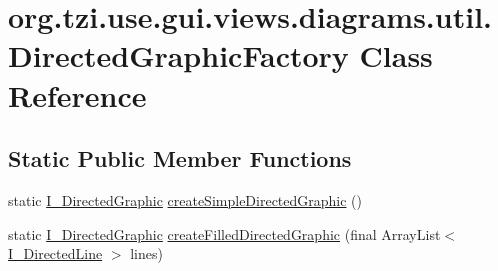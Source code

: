 \hypertarget{classorg_1_1tzi_1_1use_1_1gui_1_1views_1_1diagrams_1_1util_1_1_directed_graphic_factory}{\section{org.\-tzi.\-use.\-gui.\-views.\-diagrams.\-util.\-Directed\-Graphic\-Factory Class Reference}
\label{classorg_1_1tzi_1_1use_1_1gui_1_1views_1_1diagrams_1_1util_1_1_directed_graphic_factory}
}
\subsection*{Static Public Member Functions}
\begin{DoxyCompactItemize}
\item 
static \hyperlink{interfaceorg_1_1tzi_1_1use_1_1gui_1_1views_1_1diagrams_1_1util_1_1_i___directed_graphic}{I\-\_\-\-Directed\-Graphic} \hyperlink{classorg_1_1tzi_1_1use_1_1gui_1_1views_1_1diagrams_1_1util_1_1_directed_graphic_factory_af758ebf8a5886eb6ebfc95209499c384}{create\-Simple\-Directed\-Graphic} ()
\item 
static \hyperlink{interfaceorg_1_1tzi_1_1use_1_1gui_1_1views_1_1diagrams_1_1util_1_1_i___directed_graphic}{I\-\_\-\-Directed\-Graphic} \hyperlink{classorg_1_1tzi_1_1use_1_1gui_1_1views_1_1diagrams_1_1util_1_1_directed_graphic_factory_a13ce38938e478926793c027b356a59bb}{create\-Filled\-Directed\-Graphic} (final Array\-List$<$ \hyperlink{interfaceorg_1_1tzi_1_1use_1_1gui_1_1views_1_1diagrams_1_1util_1_1_i___directed_line}{I\-\_\-\-Directed\-Line} $>$ lines)
\end{DoxyCompactItemize}
